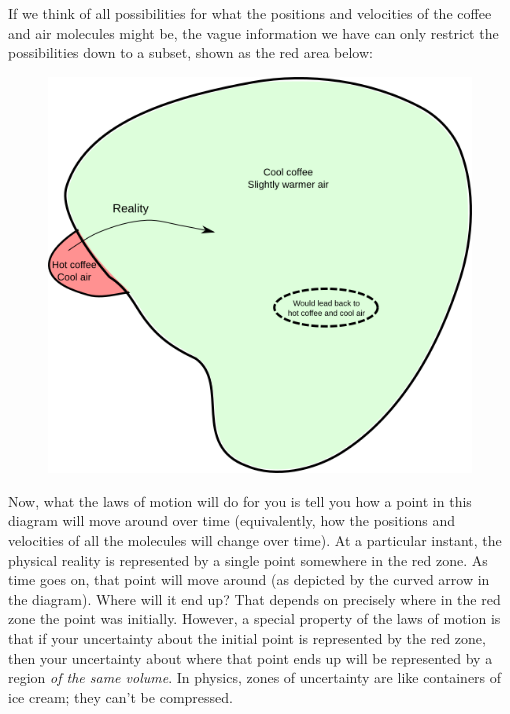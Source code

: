\documentclass[a4paper, 12pt]{article}
\begin{document}
If we think of all possibilities for what the positions and velocities of the
coffee and air molecules might be, the vague information we have
can only restrict the possibilities down to a subset, shown as the red area
below:

\begin{figure}[ht!]
\centering
\includegraphics[scale=0.6]{diagrams.png}
\end{figure}

Now, what the laws of motion will do for you is tell you how a point in this
diagram will move around over time
(equivalently, how the positions and velocities of all the molecules will
change over time). At a particular instant, the physical
reality is represented by a single point somewhere in the red zone. As time
goes on, that point will move around (as depicted by the curved arrow in
the diagram). Where will it end up? That depends on precisely where in the
red zone the point was initially. However, a special property of the laws of
motion is that if your uncertainty about the initial point is represented by
the red zone, then your uncertainty about where that point ends up will be
represented by a region {\em of the same volume}.
In physics, zones of uncertainty are
like containers of ice cream; they can't be compressed.
\end{document}
